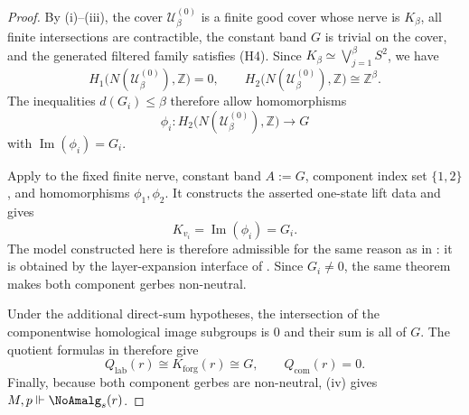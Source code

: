 \begin{proof}
By (i)--(iii), the cover
$\mathcal U_\beta^{(0)}$ is a finite good cover whose nerve is
$K_\beta$, all finite intersections are contractible, the constant band
$G$ is trivial on the cover, and the generated filtered family satisfies
\textup{(H4)}. Since $K_\beta\simeq\bigvee_{j=1}^{\beta}S^2$, we have
\[
H_1\bigl(N(\mathcal U_\beta^{(0)}),\mathbb Z\bigr)=0,
\qquad
H_2\bigl(N(\mathcal U_\beta^{(0)}),\mathbb Z\bigr)\cong \mathbb Z^\beta.
\]
The inequalities $d(G_i)\le\beta$ therefore allow homomorphisms
\[
\phi_i:H_2\bigl(N(\mathcal U_\beta^{(0)}),\mathbb Z\bigr)\to G
\]
with $\operatorname{Im}(\phi_i)=G_i$.

Apply  to the fixed finite nerve,
constant band $A:=G$, component index set $\{1,2\}$, and homomorphisms
$\phi_1,\phi_2$. It constructs the asserted one-state lift data
and gives
\[
K_{v_i}=\operatorname{Im}(\phi_i)=G_i.
\]
The model constructed here is therefore admissible for the same reason as in
: it is obtained by the layer-expansion
interface of .
Since $G_i\ne0$, the same theorem makes both component gerbes
non-neutral.

Under the additional direct-sum hypotheses, the intersection of the componentwise homological image subgroups is $0$ and their sum
is all of $G$. The quotient formulas in
therefore give
\[
Q_{\mathrm{lab}}(r)\cong K_{\mathrm{forg}}(r)\cong G,
\qquad
Q_{\mathrm{com}}(r)=0.
\]
Finally, because both component gerbes are non-neutral,
(iv) gives
$M,p\Vdash \NoAmalg_s(r)$.
\end{proof}

